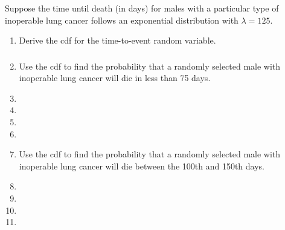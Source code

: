\begin{frame}
\frametitle{\grp}
Suppose the time until death (in days) for males with a particular type of inoperable lung cancer follows an exponential distribution with $\lambda = 125$.
\begin{enumerate}
\item Derive the cdf for the time-to-event random variable.
\end{enumerate}
\vskip 4in
\end{frame}

\begin{frame}
\frametitle{\grpc}
\begin{enumerate}
\setcounter{enumi}{1}
\item Use the cdf to find the probability that a randomly selected male with inoperable lung cancer will die in less than 75 days.
\item[]
\item[]
\item[]
\item[]
\item Use the cdf to find the probability that a randomly selected male with inoperable lung cancer will die between the 100th and 150th days.
\item[]
\item[]
\item[]
\item[]
\end{enumerate}
\end{frame}



